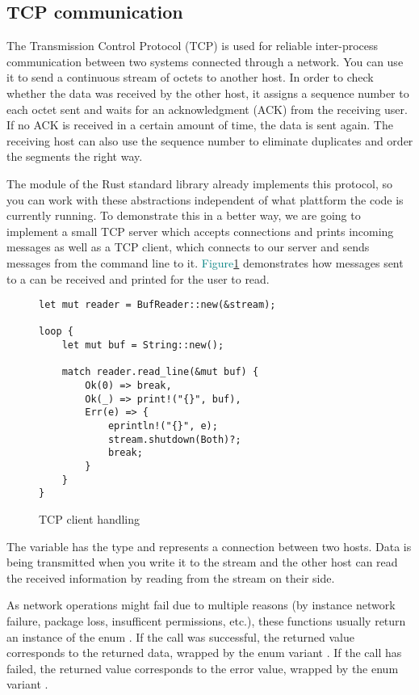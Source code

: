 \subsection{TCP communication}
The Transmission Control Protocol (TCP) is used for reliable inter-process communication between two systems connected
through a network. You can use it to send a continuous stream of octets to another host. In order to check whether the
data was received by the other host, it assigns a sequence number to each octet sent and waits for an acknowledgment
(ACK) from the receiving user. If no ACK is received in a certain amount of time, the data is sent again. The receiving
host can also use the sequence number to eliminate duplicates and order the segments the right way. \cite{RFC0793}

The module  of the Rust standard library already implements this protocol, so you can work with these
abstractions independent of what plattform the code is currently running. To demonstrate this in a better way, we are
going to implement a small TCP server which accepts connections and prints incoming messages as well as a TCP client,
which connects to our server and sends messages from the command line to it.
\textcolor{teal}{Figure\ref{tcp-client-handeling}} demonstrates how messages sent to a  can
be received and printed for the user to read.

\begin{figure}[ht]
    \begin{verbatim}
let mut reader = BufReader::new(&stream);

loop {
    let mut buf = String::new();

    match reader.read_line(&mut buf) {
        Ok(0) => break,
        Ok(_) => print!("{}", buf),
        Err(e) => {
            eprintln!("{}", e);
            stream.shutdown(Both)?;
            break;
        }
    }
}
    \end{verbatim}
    \caption{TCP client handling}
    \label{tcp-client-handeling}
\end{figure}

The variable  has the type  and represents a connection between two hosts. Data is being
transmitted when you write it to the stream and the other host can read the received information by reading from the
stream on their side.

As network operations might fail due to multiple reasons (by instance network failure, package loss, insufficent
permissions, etc.), these functions usually return an instance of the enum . If the call was
successful, the returned value corresponds to the returned data, wrapped by the enum variant . If the call
has failed, the returned value corresponds to the error value, wrapped by the enum variant .

